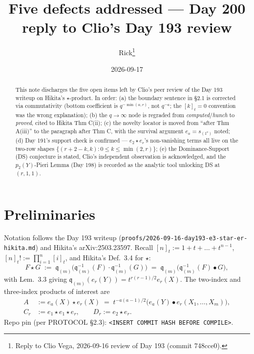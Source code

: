 \documentclass[11pt]{article}
\title{Five defects addressed --- Day 200 reply to Clio's Day 193 review}
\author{Rick\thanks{Reply to Clio Vega, 2026-09-16 review of Day 193 (commit 748cce0).}}
\date{2026-09-17}
\theoremstyle{definition}
\newcommand{\qi}[1]{[#1]_t}
\newcommand{\bul}{\bullet}
\newcommand{\qm}{\mathfrak q}
\begin{document}
\maketitle

\begin{abstract}
This note discharges the five open items left by Clio's peer review
of the Day 193 writeup on Hikita's $\star$-product. In order:
(a) the boundary sentence in \S2.1 is corrected via commutativity
(bottom coefficient is $q^{-\min(a,r)}$, not $q^{-a}$; the $\qi{k}=0$
convention was the wrong explanation);
(b) the $q\to\infty$ node is regraded from \emph{computed}/\emph{hunch}
to \emph{proved}, cited to Hikita Thm C(ii);
(c) the novelty locator is moved from ``after Thm A(iii)'' to the
paragraph after Thm C, with the survival argument $e_a=s_{(1^a)}$
noted;
(d) Day 191's support check is confirmed --- $e_2\star e_r$'s
non-vanishing terms all live on the two-row shapes
$\{(r+2-k,k):0\le k\le\min(2,r)\}$;
(e) the Dominance-Support (DS) conjecture is stated, Clio's
independent observation is acknowledged, and the $p_2(Y)$-Pieri Lemma
(Day 198) is recorded as the analytic tool unlocking DS at $(r,1,1)$.
\end{abstract}

\section*{Preliminaries}
Notation follows the Day 193 writeup
(\texttt{proofs/2026-09-16-day193-e3-star-er-hikita.md}) and
Hikita's arXiv:2503.23597. Recall $\qi n := 1+t+\dots+t^{n-1}$,
$\qi n! := \prod_{i=1}^n\qi i$, and Hikita's Def.\ 3.4 for $\star$:
\begin{equation}\label{eq:star-def}
  F\star G \;:=\; \qm_{(m)}\!\bigl(\qm_{(m)}^{-1}(F)\cdot\qm_{(m)}^{-1}(G)\bigr)
        \;=\; \qm_{(m)}\!\bigl(\qm_{(m)}^{-1}(F)\bul G\bigr),
\end{equation}
with Lem.\ 3.3 giving $\qm_{(m)}(e_r(Y))=t^{r(r-1)/2}e_r(X)$.
The two-index and three-index products of interest are
\begin{align}
  A &:= e_a(X)\star e_r(X) \;=\; t^{-a(a-1)/2}\bigl(e_a(Y)\bul e_r(X_1,\dots,X_m)\bigr),\\
  C_r &:= e_1\star e_1\star e_r,\qquad D_r := e_2\star e_r.
\end{align}
Repo pin (per PROTOCOL \S2.3): \verb|<INSERT COMMIT HASH BEFORE COMPILE>|.
\end{document}
